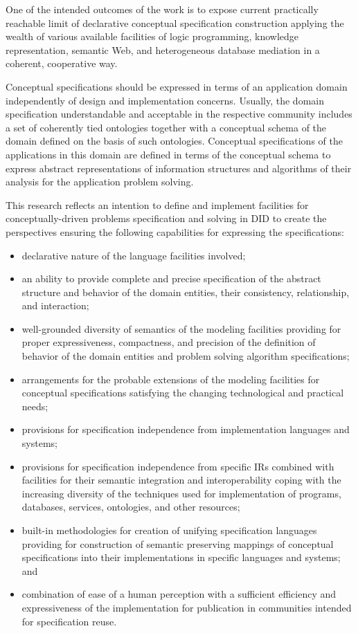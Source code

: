 \begin{multicols}{2}
  One of the intended outcomes of the work is to expose current practically
reachable limit of declarative conceptual specification construction applying the
wealth of various available facilities of logic programming, knowledge representation,
semantic Web, and heterogeneous database mediation in a coherent, cooperative way.

  Conceptual specifications should be expressed in terms of an application domain
independently of design and implementation concerns. Usually, the domain
specification understandable and acceptable in the respective community includes a
set of coherently tied ontologies together with a conceptual schema of the domain
defined on the basis of such ontologies. Conceptual specifications of the applications
in this domain are defined in terms of the conceptual schema to express abstract
representations of information structures and algorithms of their analysis for the
application problem solving.

  This research reflects an intention to define and implement facilities for
conceptually-driven problems specification and solving in DID to create the
perspectives ensuring the following capabilities for expressing the specifications:
  \begin{itemize}
\item declarative nature of the language facilities involved;
\item an ability to provide complete and precise specification of the abstract structure
and behavior of the domain entities, their consistency, relationship, and interaction;
\item well-grounded diversity of semantics of the modeling facilities providing for
proper expressiveness, compactness, and precision of the definition of behavior of the
domain entities and problem solving algorithm specifications;
\item arrangements for the probable extensions of the modeling facilities for
conceptual specifications satisfying the changing technological and practical needs;
\item provisions for specification independence from implementation languages and
systems;
\item provisions for specification independence from specific IRs
combined with facilities for their semantic integration and interoperability coping
with the increasing diversity of the techniques used for implementation of programs,
databases, services, ontologies, and other resources;
\item built-in methodologies for creation of unifying specification languages
providing for construction of semantic preserving mappings of conceptual
specifications into their implementations in specific languages and systems; and
\item combination of ease of a human perception with a sufficient efficiency and
expressiveness of the implementation for publication in communities intended for
specification reuse.
\end{itemize}


\end{multicols}
